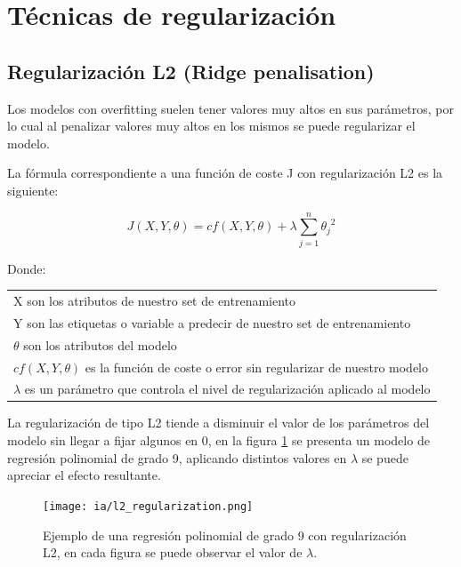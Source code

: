 \documentclass[11pt,fleqn]{book} %
\begin{document}
\section{Técnicas de regularización} 

\subsection{Regularización L2 (Ridge penalisation)} 

Los modelos con overfitting suelen tener valores muy altos en sus parámetros, por lo cual al penalizar valores muy altos en los mismos se puede regularizar el modelo.

La fórmula correspondiente a una función de coste J con regularización L2 es la siguiente:

\begin{equation}
J(X,Y,\theta) = cf(X,Y,\theta) + \lambda \sum_{j=1}^{n} {\theta_{j}}^{2}
\end{equation}

Donde:

\begin{tabular}{l}
	X son los atributos de nuestro set de entrenamiento\\
	Y son las etiquetas o variable a predecir de nuestro set de entrenamiento\\
	$\theta$ son los atributos del modelo\\
	$cf(X,Y,\theta)$ es la función de coste o error sin regularizar de nuestro modelo\\
	$\lambda$ es un parámetro que controla el nivel de regularización aplicado al modelo\\

\end{tabular}

La regularización de tipo L2 tiende a disminuir el valor de los parámetros del modelo sin llegar a fijar algunos en 0, en la figura \ref{fig:l2_regularization} se presenta un modelo de regresión polinomial de grado 9, aplicando distintos valores en $\lambda$ se puede apreciar el efecto resultante. 


\begin{figure}[ht]
\centering\texttt{[image: ia/l2\_regularization.png]}
\caption{Ejemplo de una regresión polinomial de grado 9 con regularización L2, en cada figura se puede observar el valor de $\lambda$.}

\label{fig:l2_regularization} 
\end{figure}
\end{document}
